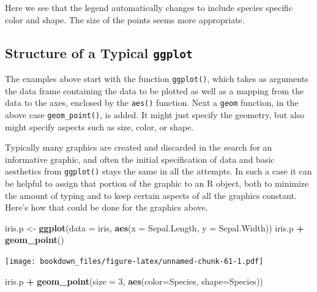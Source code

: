 \documentclass[
]{krantz}
\makeatletter
\newenvironment{Shaded}{\begin{snugshade}}{\end{snugshade}}
\newcommand{\DataTypeTok}[1]{\textcolor[rgb]{0.27,0.27,0.27}{#1}}
\newcommand{\DecValTok}[1]{\textcolor[rgb]{0.06,0.06,0.06}{#1}}
\newcommand{\KeywordTok}[1]{\textcolor[rgb]{0.27,0.27,0.27}{\textbf{#1}}}
\newcommand{\NormalTok}[1]{#1}
\newcommand{\OperatorTok}[1]{\textcolor[rgb]{0.43,0.43,0.43}{\textbf{#1}}}
\newcommand{\StringTok}[1]{\textcolor[rgb]{0.5,0.5,0.5}{#1}}
\newenvironment{kframe}{%
\medskip{}
\setlength{\fboxsep}{.8em}
 \def\at@end@of@kframe{}%
 \ifinner\ifhmode%
  \def\at@end@of@kframe{\end{minipage}}%
  \begin{minipage}{\columnwidth}%
 \fi\fi%
 \def\FrameCommand##1{\hskip\@totalleftmargin \hskip-\fboxsep
 \colorbox{shadecolor}{##1}\hskip-\fboxsep
     \hskip-\linewidth \hskip-\@totalleftmargin \hskip\columnwidth}%
 \MakeFramed {\advance\hsize-\width
   \@totalleftmargin\z@ \linewidth\hsize
   \@setminipage}}%
 {\par\unskip\endMakeFramed%
 \at@end@of@kframe}
\renewenvironment{Shaded}{\begin{kframe}}{\end{kframe}}
\makeatother
\begin{document}
Here we see that the legend automatically changes to include species specific color and shape. The size of the points seems more appropriate.

\hypertarget{structure-of-a-typical-ggplot}{%
\subsection{\texorpdfstring{Structure of a Typical \texttt{ggplot}}{Structure of a Typical ggplot}}\label{structure-of-a-typical-ggplot}}

The examples above start with the function \texttt{ggplot()}, which takes as arguments the data frame containing the data to be plotted as well as a mapping from the data to the axes, enclosed by the \texttt{aes()} function. Next a \texttt{geom} function, in the above case \texttt{geom\_point()}, is added. It might just specify the geometry, but also might specify aspects such as size, color, or shape.

Typically many graphics are created and discarded in the search for an informative graphic, and often the initial specification of data and basic aesthetics from \texttt{ggplot()} stays the same in all the attempts. In such a case it can be helpful to assign that portion of the graphic to an R object, both to minimize the amount of typing and to keep certain aspects of all the graphics constant. Here's how that could be done for the graphics above.

\begin{Shaded}
\begin{Highlighting}[]
\NormalTok{iris.p \textless{}{-}}\StringTok{ }\KeywordTok{ggplot}\NormalTok{(}\DataTypeTok{data =}\NormalTok{ iris, }\KeywordTok{aes}\NormalTok{(}\DataTypeTok{x =}\NormalTok{ Sepal.Length, }\DataTypeTok{y =}\NormalTok{ Sepal.Width)) }
\NormalTok{iris.p }\OperatorTok{+}\StringTok{ }\KeywordTok{geom\_point}\NormalTok{()}
\end{Highlighting}
\end{Shaded}

\texttt{[image: bookdown\_files/figure-latex/unnamed-chunk-61-1.pdf]}

\begin{Shaded}
\begin{Highlighting}[]
\NormalTok{iris.p }\OperatorTok{+}\StringTok{ }\KeywordTok{geom\_point}\NormalTok{(}\DataTypeTok{size =} \DecValTok{3}\NormalTok{, }\KeywordTok{aes}\NormalTok{(}\DataTypeTok{color=}\NormalTok{Species, }\DataTypeTok{shape=}\NormalTok{Species))}
\end{Highlighting}
\end{Shaded}
\end{document}
